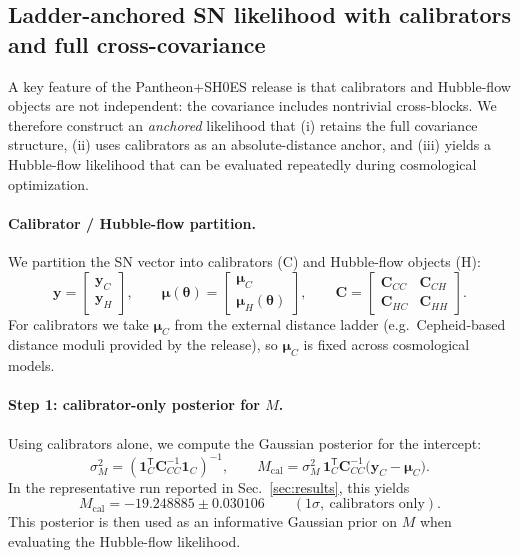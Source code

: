 \documentclass[10pt]{article}
\begin{document}
\subsection{Ladder-anchored SN likelihood with calibrators and full cross-covariance}
\label{sec:sn_anchor_like}

A key feature of the Pantheon+SH0ES release is that calibrators and Hubble-flow objects are not independent: the covariance includes nontrivial cross-blocks. We therefore construct an \emph{anchored} likelihood that (i) retains the full covariance structure, (ii) uses calibrators as an absolute-distance anchor, and (iii) yields a Hubble-flow likelihood that can be evaluated repeatedly during cosmological optimization.

\paragraph{Calibrator / Hubble-flow partition.}
We partition the SN vector into calibrators (C) and Hubble-flow objects (H):
\begin{equation}
\bm{y}=
\begin{bmatrix}
\bm{y}_C\\
\bm{y}_H
\end{bmatrix},
\qquad
\bm{\mu}(\bm{\theta})=
\begin{bmatrix}
\bm{\mu}_C\\
\bm{\mu}_H(\bm{\theta})
\end{bmatrix},
\qquad
\bm{C}=
\begin{bmatrix}
\bm{C}_{CC} & \bm{C}_{CH}\\
\bm{C}_{HC} & \bm{C}_{HH}
\end{bmatrix}.
\end{equation}
For calibrators we take $\bm{\mu}_C$ from the external distance ladder (e.g.\ Cepheid-based distance moduli provided by the release), so $\bm{\mu}_C$ is fixed across cosmological models.

\paragraph{Step 1: calibrator-only posterior for $M$.}
Using calibrators alone, we compute the Gaussian posterior for the intercept:
\begin{equation}
\sigma_M^2 = \left(\bm{1}_C^{\mathsf{T}}\bm{C}_{CC}^{-1}\bm{1}_C\right)^{-1},
\qquad
M_{\mathrm{cal}} = \sigma_M^2\,\bm{1}_C^{\mathsf{T}}\bm{C}_{CC}^{-1}\bigl(\bm{y}_C-\bm{\mu}_C\bigr).
\label{eq:Mcal}
\end{equation}
In the representative run reported in Sec.~\ref{sec:results}, this yields
\begin{equation}
M_{\mathrm{cal}} = -19.248885 \pm 0.030106 \qquad (1\sigma,\ \text{calibrators only}).
\end{equation}
This posterior is then used as an informative Gaussian prior on $M$ when evaluating the Hubble-flow likelihood.
\end{document}
